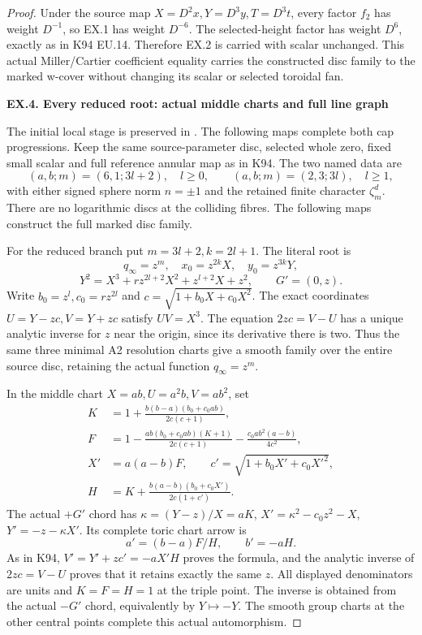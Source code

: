 \begin{proof}
\par\nobreak

Under the source map \(X=D^2x,Y=D^3y,T=D^3t\), every factor
\(f_2\) has weight \(D^{-1}\), so EX.1 has weight \(D^{-6}\).
The selected-height factor has weight \(D^6\), exactly as in
K94 EU.14. Therefore EX.2 is carried with scalar unchanged.
This actual Miller/Cartier coefficient equality carries the
constructed disc family to the marked w-cover without changing
its scalar or selected toroidal fan.

\par

\medskip\noindent\textbf{EX.4. Every reduced root: actual middle charts and full line graph}

\par\nobreak

The initial local stage is preserved in . The following maps complete both cap progressions.
Keep the same source-parameter disc, selected whole zero, fixed
small scalar and full reference annular map as in K94. The two
named data are
\[
 (a,b;m)=(6,1;3l+2),\quad l\ge0,
 \qquad (a,b;m)=(2,3;3l),\quad l\ge1,
\]
with either signed sphere norm \(n=\pm1\) and the retained finite
character \(\zeta_m^d\). There are no logarithmic discs at the
colliding fibres. The following maps construct the full marked disc family.

For the reduced branch put \(m=3l+2,k=2l+1\). The literal root is
\[
 q_\infty=z^m,\quad x_0=z^{2k}X,\quad y_0=z^{3k}Y,
\]
\[
 Y^2=X^3+r z^{2l+2}X^2+z^{l+2}X+z^2,\qquad G'=(0,z).
 \tag{EX.6}
\]
Write \(b_0=z^l,c_0=r z^{2l}\) and
\(c=\sqrt{1+b_0X+c_0X^2}\). The exact coordinates
\(U=Y-zc,V=Y+zc\) satisfy \(UV=X^3\). The equation
\(2zc=V-U\) has a unique analytic inverse for \(z\) near the
origin, since its derivative there is two. Thus the same three
minimal A2 resolution charts give a smooth family over the entire
source disc, retaining the actual function \(q_\infty=z^m\).

In the middle chart \(X=ab,U=a^2b,V=ab^2\), set
\[
\begin{aligned}
 K&=1+\frac{b(b-a)(b_0+c_0ab)}{2c(c+1)},\\
 F&=1-\frac{ab(b_0+c_0ab)(K+1)}{2c(c+1)}
           -\frac{c_0ab^2(a-b)}{4c^2},\\
 X'&=a(a-b)F,\qquad c'=\sqrt{1+b_0X'+c_0X'^2},\\
 H&=K+\frac{b(a-b)(b_0+c_0X')}{2c(1+c')}.
\end{aligned}
\]
The actual \(+G'\) chord has \(\kappa=(Y-z)/X=aK\),
\(X'=\kappa^2-c_0z^2-X\), \(Y'=-z-\kappa X'\).
Its complete toric chart arrow is
\[
                  a'=(b-a)F/H,\qquad b'=-aH.
 \tag{EX.7}
\]
As in K94, \(V'=Y'+zc'=-aX'H\) proves the formula, and the
analytic inverse of \(2zc=V-U\) proves that it retains exactly
the same \(z\). All displayed denominators are units and
\(K=F=H=1\) at the triple point. The inverse is obtained from
the actual \(-G'\) chord, equivalently by \(Y\mapsto-Y\).
The smooth group charts at the other central points complete
this actual automorphism.


\end{proof}
